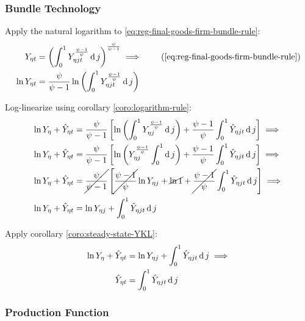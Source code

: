 \documentclass[../thesis.tex]{subfiles}
\begin{document}

	\subsubsection*{Bundle Technology}

Apply the natural logarithm to \ref{eq:reg-final-goods-firm-bundle-rule}:
\begin{align}
	Y_{\eta t} &= \left( \int_{0}^{1} Y_{\eta jt}^{\frac{\psi-1}{\psi}} \dif j \right)^{\frac{\psi}{\psi-1}} \implies  \tag{\ref{eq:reg-final-goods-firm-bundle-rule}} \\
	\ln{Y_{\eta t}} &= {\frac{\psi}{\psi-1}} \ln{\left( \int_{0}^{1} Y_{\eta jt}^{\frac{\psi-1}{\psi}} \dif j \right)} \nonumber
\end{align}

Log-linearize using corollary \ref{coro:logarithm-rule}:
\begin{align}
	\ln{Y_{\eta}} + \hat{Y}_{\eta t} &= \frac{\psi}{\psi-1} \left[ \ln \left( \int_{0}^{1} Y_{\eta j}^{\frac{\psi-1}{\psi}} \operatorname{d} j \right) + \frac{\psi-1}{\psi} \int_{0}^{1} \hat{Y}_{\eta jt} \operatorname{d} j \right] \implies \nonumber
	\\
	\ln{Y_{\eta}} + \hat{Y}_{\eta t} &= \frac{\psi}{\psi-1} \left[ \ln \left( Y_{\eta j}^{\frac{\psi-1}{\psi}} \int_{0}^{1} \operatorname{d} j \right) + \frac{\psi-1}{\psi} \int_{0}^{1} \hat{Y}_{\eta jt} \operatorname{d} j \right] \implies \nonumber
	\\
	\ln{Y_{\eta}} + \hat{Y}_{\eta t} &= \cancel{\frac{\psi}{\psi-1}} \left[ \cancel{\frac{\psi-1}{\psi}} \ln{Y_{\eta j}} + \cancel{\ln1} + \cancel{\frac{\psi-1}{\psi}} \int_{0}^{1} \hat{Y}_{\eta jt} \operatorname{d} j \right] \implies \nonumber
	\\
	\ln{Y_{\eta}} + \hat{Y}_{\eta t} &= \ln{Y_{\eta j}} + \int_{0}^{1} \hat{Y}_{\eta jt} \operatorname{d} j \nonumber
\end{align}

Apply corollary \ref{coro:steady-state-YKL}:
\begin{align}
	\ln{Y_{\eta}} + \hat{Y}_{\eta t} &= \ln{Y_{\eta j}} + \int_{0}^{1} \hat{Y}_{\eta jt} \operatorname{d} j \implies \nonumber \\
	\hat{Y}_{\eta t} &= \int_{0}^{1} \hat{Y}_{\eta jt} \operatorname{d} j 
	\label{eq:reg-ll-final-goods-firm-bundle-rule}
\end{align}


\subsubsection*{Production Function}
\end{document}
